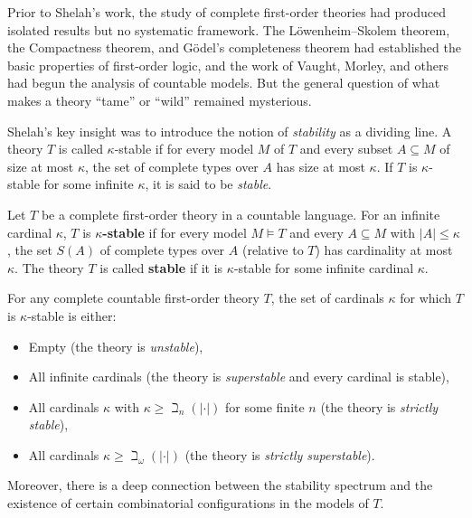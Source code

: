Prior to Shelah's work, the study of complete first-order theories had produced isolated results but no systematic framework. The L\"owenheim--Skolem theorem, the Compactness theorem, and G\"odel's completeness theorem had established the basic properties of first-order logic, and the work of Vaught, Morley, and others had begun the analysis of countable models. But the general question of what makes a theory ``tame'' or ``wild'' remained mysterious.

Shelah's key insight was to introduce the notion of \emph{stability} as a dividing line. A theory \(T\) is called \(\kappa\)-stable if for every model \(M\) of \(T\) and every subset \(A \subseteq M\) of size at most \(\kappa\), the set of complete types over \(A\) has size at most \(\kappa\). If \(T\) is \(\kappa\)-stable for some infinite \(\kappa\), it is said to be \emph{stable}.

\begin{definition}
Let \(T\) be a complete first-order theory in a countable language. For an infinite cardinal \(\kappa\), \(T\) is \textbf{\(\kappa\)-stable} if for every model \(M \models T\) and every \(A \subseteq M\) with \(|A| \leq \kappa\), the set \(S(A)\) of complete types over \(A\) (relative to \(T\)) has cardinality at most \(\kappa\). The theory \(T\) is called \textbf{stable} if it is \(\kappa\)-stable for some infinite cardinal \(\kappa\).
\end{definition}

\begin{theorem}
For any complete countable first-order theory \(T\), the set of cardinals \(\kappa\) for which \(T\) is \(\kappa\)-stable is either:
\begin{itemize}
    \item Empty (the theory is \emph{unstable}),
    \item All infinite cardinals (the theory is \emph{superstable} and every cardinal is stable),
    \item All cardinals \(\kappa\) with \(\kappa \geq \beth_{n}(|\cdot|)\) for some finite \(n\) (the theory is \emph{strictly stable}),
    \item All cardinals \(\kappa \geq \beth_{\omega}(|\cdot|)\) (the theory is \emph{strictly superstable}).
\end{itemize}
Moreover, there is a deep connection between the stability spectrum and the existence of certain combinatorial configurations in the models of \(T\).
\end{theorem}

